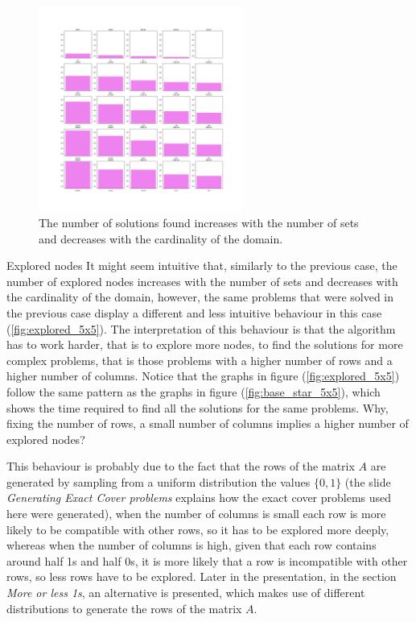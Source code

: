\documentclass{beamer}
\begin{document}
\begin{frame}
    \begin{figure}
        \centering
        \includegraphics[width=0.6\textwidth]{sol_5x5.pdf}
        \caption{The number of solutions found increases with the number of sets 
        and decreases with the cardinality of the domain.}
        \label{fig:sol_5x5}
    \end{figure}
\end{frame}

\begin{frame}{Explored nodes}
    It might seem intuitive that, similarly to the previous case, the number of explored nodes
    increases with the number of sets and decreases with the cardinality of the domain,
    however, the same problems that were solved in the previous case display a different
    and less intuitive behaviour in this case (\ref{fig:explored_5x5}).
    The interpretation of this behaviour is that the algorithm has to work harder,
    that is to explore more nodes, to find the solutions for more complex problems, that
    is those problems with a higher number of rows and a higher number of columns.
    Notice that the graphs in figure (\ref{fig:explored_5x5}) follow the same pattern
    as the graphs in figure (\ref{fig:base_star_5x5}), which shows the time required to find all
    the solutions for the same problems.
    Why, fixing the number of rows, a small number of columns implies a higher
    number of explored nodes? 
\end{frame}    

\begin{frame}{}    
    This behaviour is probably due to the fact that the rows
    of the matrix $A$ are generated by sampling from a uniform distribution the values 
    $\{0, 1\}$ (the slide \textit{Generating Exact Cover problems} explains how 
    the exact cover problems used here were generated), when the number of columns is small each row is more likely to be 
    compatible with other rows, so it has to be explored more deeply, whereas when the 
    number of columns is high, given that each row contains around half 1s and half 0s,
    it is more likely that a row is incompatible with other rows, so less rows have to be 
    explored.
    Later in the presentation, in the section \textit{More or less 1s}, an alternative is presented,
    which makes use of different distributions to generate the rows of the matrix $A$.
\end{frame}
\end{document}

